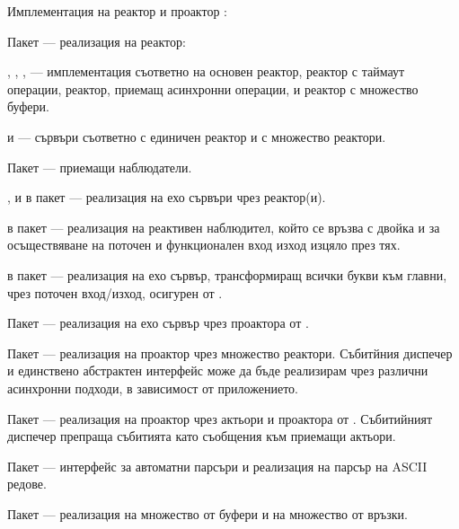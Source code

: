 \begin{attachment}{Имплементация на реактор и проактор}
  \label{att:reactor-proactor}
  :
  
  \begin{itemize*}
    \item Пакет  — реализация на реактор:
      \begin{itemize*}
        \item {}, , ,  — имплементация съответно на основен реактор, реактор с таймаут операции, реактор, приемащ асинхронни операции, и реактор с множество буфери.
         
        \item {} и  — сървъри съответно с единичен реактор и с множество реактори.
         
        \item Пакет  — приемащи наблюдатели.
      \end{itemize*}
       
    \item {},  и  в пакет  — реализация на ехо сървъри чрез реактор(и).
    
    \item {} в пакет  — реализация на реактивен наблюдител, който се връзва с двойка  и  за осъществяване на поточен и функционален вход изход изцяло през тях.
    
    \item {} в пакет  — реализация на ехо сървър, трансформиращ всички букви към главни, чрез поточен вход/изход, осигурен от .
    
    \item Пакет  — реализация на ехо сървър чрез проактора от .
    
    \item Пакет  — реализация на проактор чрез множество реактори. Събитйния диспечер и единствено абстрактен интерфейс може да бъде реализирам чрез различни асинхронни подходи, в зависимост от приложението.
    
    \item Пакет  — реализация на проактор чрез актьори и проактора от . Събитийният диспечер препраща събитията като съобщения към приемащи актьори.
    
    \item Пакет  — интерфейс за автоматни парсъри и реализация на парсър на ASCII редове.
    
    \item Пакет  — реализация на множество от буфери и на множество от връзки.
  \end{itemize*}
\end{attachment}

